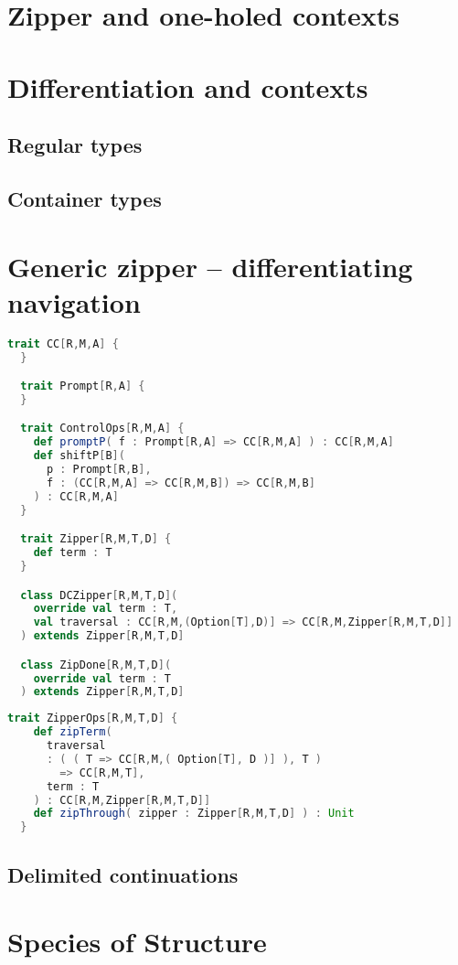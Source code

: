 \section{Zipper and one-holed contexts}

\section{Differentiation and contexts}

\subsection{Regular types}

\subsection{Container types}

\section{Generic zipper -- differentiating navigation}

\begin{lstlisting}[language=Scala,mathescape=true]
  trait CC[R,M,A] {
  }

  trait Prompt[R,A] {
  }

  trait ControlOps[R,M,A] {
    def promptP( f : Prompt[R,A] => CC[R,M,A] ) : CC[R,M,A]
    def shiftP[B](
      p : Prompt[R,B],
      f : (CC[R,M,A] => CC[R,M,B]) => CC[R,M,B]
    ) : CC[R,M,A]
  }

  trait Zipper[R,M,T,D] {
    def term : T
  }

  class DCZipper[R,M,T,D](
    override val term : T,
    val traversal : CC[R,M,(Option[T],D)] => CC[R,M,Zipper[R,M,T,D]]
  ) extends Zipper[R,M,T,D]

  class ZipDone[R,M,T,D](
    override val term : T
  ) extends Zipper[R,M,T,D]
\end{lstlisting}

\break

\begin{lstlisting}[language=Scala,mathescape=true]
  trait ZipperOps[R,M,T,D] {
    def zipTerm(
      traversal
      : ( ( T => CC[R,M,( Option[T], D )] ), T )
        => CC[R,M,T],
      term : T
    ) : CC[R,M,Zipper[R,M,T,D]]
    def zipThrough( zipper : Zipper[R,M,T,D] ) : Unit
  }
\end{lstlisting}

\subsection{Delimited continuations}

\section{Species of Structure}